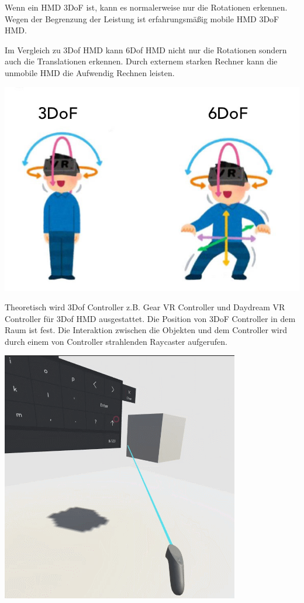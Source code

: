   Wenn ein HMD 3DoF ist, kann es normalerweise nur die Rotationen erkennen. Wegen der Begrenzung der Leistung ist erfahrungsmäßig mobile HMD 3DoF HMD.
  
  Im Vergleich zu 3Dof HMD kann 6Dof HMD nicht nur die Rotationen sondern auch die Translationen erkennen. Durch externem starken Rechner kann die unmobile HMD die Aufwendig Rechnen leisten.
  
   \includegraphics[width=\textwidth]{images/6DoF-vs-3DoF.jpg}
  
  Theoretisch wird 3Dof Controller z.B. Gear VR Controller und Daydream VR Controller für 3Dof HMD ausgestattet. Die Position von 3DoF Controller in dem Raum ist fest. Die Interaktion zwischen die Objekten und dem Controller wird durch einem von Controller strahlenden Raycaster aufgerufen.

\includegraphics[width=\textwidth]{images/3dcontroller.png}
  
